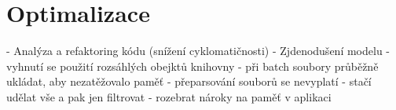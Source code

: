 \chapter{Optimalizace}
 - Analýza a refaktoring kódu (snížení cyklomatičnosti)
 - Zjdenodušení modelu - vyhnutí se použití rozsáhlých obejktů knihovny
 - při batch soubory průběžně ukládat, aby nezatěžovalo paměť
 - přeparsování souborů se nevyplatí - stačí udělat vše a pak jen filtrovat 
 - rozebrat nároky na paměť v aplikaci
